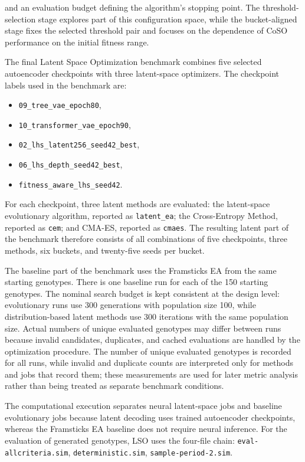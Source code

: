 and an evaluation budget defining the algorithm's stopping point. The threshold-selection stage explores part of this configuration space, while the bucket-aligned stage fixes the selected threshold pair and focuses on the dependence of CoSO performance on the initial fitness range.


The final Latent Space Optimization benchmark combines five selected autoencoder checkpoints with three latent-space optimizers. The checkpoint labels used in the benchmark are:
\begin{itemize}
    \item \texttt{09\_tree\_vae\_epoch80},
    \item \texttt{10\_transformer\_vae\_epoch90},
    \item \texttt{02\_lhs\_latent256\_seed42\_best},
    \item \texttt{06\_lhs\_depth\_seed42\_best},
    \item \texttt{fitness\_aware\_lhs\_seed42}.
\end{itemize}
For each checkpoint, three latent methods are evaluated: the latent-space evolutionary algorithm, reported as \texttt{latent\_ea}; the Cross-Entropy Method, reported as \texttt{cem}; and CMA-ES, reported as \texttt{cmaes}. The resulting latent part of the benchmark therefore consists of all combinations of five checkpoints, three methods, six buckets, and twenty-five seeds per bucket.

The baseline part of the benchmark uses the Framsticks EA from the same starting genotypes. There is one baseline run for each of the 150 starting genotypes. The nominal search budget is kept consistent at the design level: evolutionary runs use 300 generations with population size 100, while distribution-based latent methods use 300 iterations with the same population size. Actual numbers of unique evaluated genotypes may differ between runs because invalid candidates, duplicates, and cached evaluations are handled by the optimization procedure. The number of unique evaluated genotypes is recorded for all runs, while invalid and duplicate counts are interpreted only for methods and jobs that record them; these measurements are used for later metric analysis rather than being treated as separate benchmark conditions.

The computational execution separates neural latent-space jobs and baseline evolutionary jobs because latent decoding uses trained autoencoder checkpoints, whereas the Framsticks EA baseline does not require neural inference. For the evaluation of generated genotypes, LSO uses the four-file chain: \texttt{eval-allcriteria.sim}, \texttt{deterministic.sim}, \texttt{sample-period-2.sim}.


